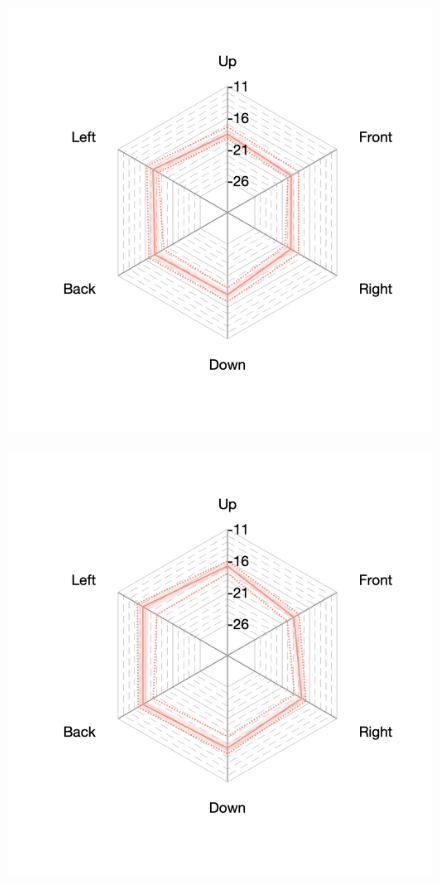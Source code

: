 \documentclass[11pt,a4j]{jreport}
\begin{document}
\begin{figure}[H]
\begin{minipage}[b]{.33\textwidth}
        \includegraphics[width=1\linewidth]{images/realHallDirSt/early_hall_b_allpoints.png}
        \label{fig:ホールBにおけるSTEarly}
      \end{minipage}%
      \begin{minipage}[b]{.33\textwidth}
        \centering
        \includegraphics[width=1\linewidth]{images/realHallDirSt/early_hall_c_allpoints.png}
        \label{fig:ホールCにおけるSTEarly}
      \end{minipage}


\end{figure}
\end{document}

